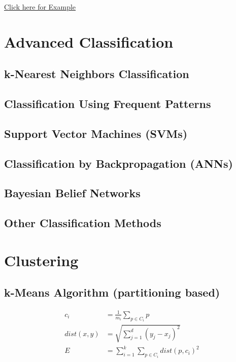 \documentclass{article}
\begin{document}
                \begin{center}
                    \href{https://github.com/chris24s/COMP3605-Introduction-to-Data-Analytics-Cheat-Sheet/blob/master/Examples/1.%20Classification/Evaluate%20Classifier%20Performance%20example.pdf}{Click here for Example}
                \end{center}


        \newpage
        \section{Advanced Classification}
            \subsection{k-Nearest Neighbors Classification}
            \subsection{Classification Using Frequent Patterns}
            \subsection{Support Vector Machines (SVMs)}
            \subsection{Classification by Backpropagation (ANNs)}
            \subsection{Bayesian Belief Networks}
            \subsection{Other Classification Methods}


        \newpage
        \section{Clustering}
            \subsection{k-Means Algorithm (partitioning based)}
                \begin{align*}
                    c_i &= \frac{1}{m_i}\sum_{p\in C_i}p\\
                    dist(x,y) &= \sqrt{\sum_{j=1}^d(y_j-x_j)^2}\\
                    E &= \sum_{i=1}^k\sum_{p \in C_i}dist(p,c_i)^2\\
                \end{align*}
\end{document}
